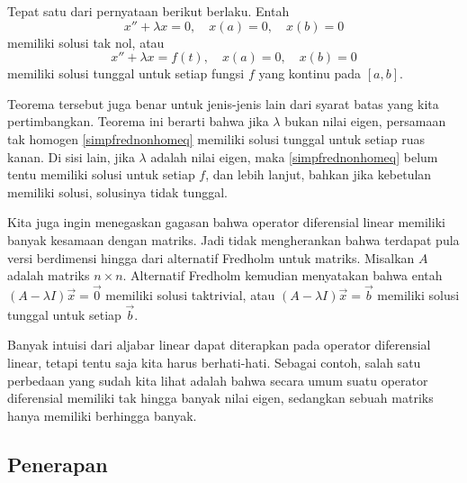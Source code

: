 \begin{theorem}
\label{thm:fredholmsimple}
Tepat satu dari pernyataan berikut berlaku.
Entah
\begin{equation} \label{simpfredhomeq}
x'' + \lambda x = 0, \quad x(a) = 0, \quad x(b) = 0
\end{equation}
memiliki solusi tak nol, atau
\begin{equation} \label{simpfrednonhomeq}
x'' + \lambda x = f(t), \quad x(a) = 0, \quad x(b) = 0
\end{equation}
memiliki solusi tunggal untuk setiap fungsi $f$ yang kontinu pada $[a,b]$.
\end{theorem}

Teorema tersebut juga benar untuk jenis-jenis lain dari
syarat batas yang kita pertimbangkan.
Teorema ini berarti bahwa jika $\lambda$ bukan nilai eigen, persamaan tak homogen
\eqref{simpfrednonhomeq} memiliki solusi tunggal untuk setiap ruas
kanan.  Di sisi lain, jika $\lambda$ adalah nilai eigen, maka
\eqref{simpfrednonhomeq} belum tentu memiliki solusi untuk setiap $f$,
dan lebih lanjut,
bahkan jika kebetulan memiliki solusi, solusinya tidak
tunggal.

Kita juga ingin menegaskan gagasan bahwa operator diferensial linear memiliki
banyak kesamaan dengan matriks.  Jadi tidak mengherankan bahwa
terdapat pula versi berdimensi hingga dari alternatif Fredholm untuk matriks.
Misalkan $A$ adalah matriks $n \times n$.  Alternatif Fredholm kemudian
menyatakan bahwa entah $(A-\lambda I) \vec{x}
= \vec{0}$ memiliki solusi taktrivial, atau $(A-\lambda I) \vec{x} = \vec{b}$
memiliki solusi tunggal untuk setiap $\vec{b}$.

Banyak intuisi dari aljabar linear dapat diterapkan pada operator diferensial
linear, tetapi tentu saja kita harus berhati-hati.  Sebagai contoh, salah satu
perbedaan yang sudah kita lihat adalah bahwa secara umum suatu operator diferensial
memiliki tak hingga banyak nilai eigen, sedangkan sebuah matriks hanya memiliki berhingga banyak.

\subsection{Penerapan}

